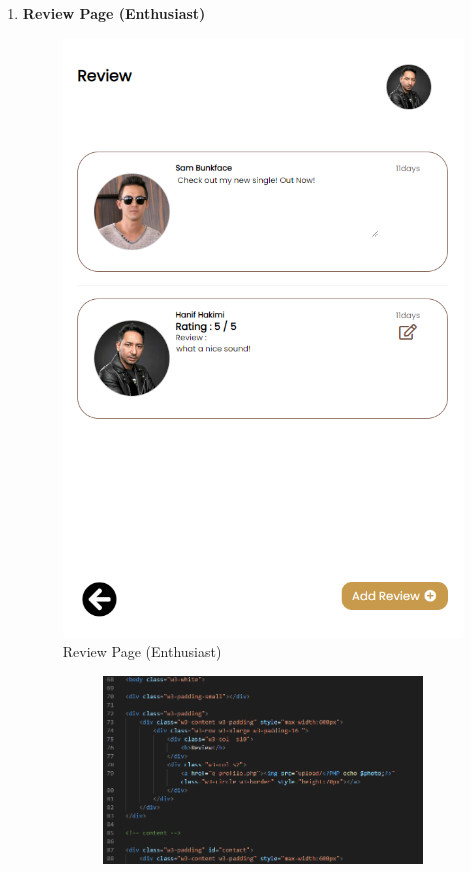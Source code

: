 \begin{enumerate}[1.]
    \item \textbf{Review Page (Enthusiast)}
    \begin{figure}[h]
        \centering
        \includegraphics[width=0.5\linewidth]{mainmatter/images/frontend/ss/Review (Enthusiast).png}
        \caption{Review Page (Enthusiast)}
        \label{fig:myfig65}
    \end{figure}
    \begin{figure}[h]\ContinuedFloat
        \centering
        \begin{subfigure}[b]{0.6\textwidth}
            \centering
            \includegraphics[width=\textwidth]{mainmatter/images/frontend/code/ereview.png}
            \label{fig:sub1}
        \end{subfigure}
        \hspace{0.04\textwidth}
        \begin{subfigure}[b]{0.6\textwidth}

\end{subfigure}
\end{figure}
\end{enumerate}
